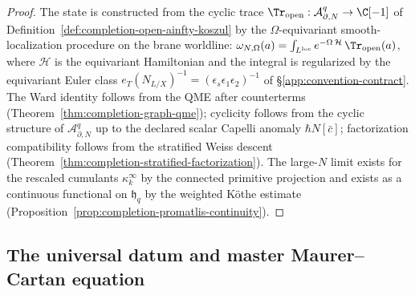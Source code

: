 \begin{proof}
The state is constructed from the cyclic trace
\(\Tr_{\mathrm{open}}:\mathcal A^q_{\partial,N}\to\C[-1]\) of
Definition~\ref{def:completion-open-ainfty-koszul} by the
\(\Omega\)-equivariant smooth-localization procedure on the brane
worldline: \(\omega_{N,\Omega}(a)=
\int_{L^{\mathrm{loc}}}e^{-\Omega\,\mathcal H}\,\Tr_{\mathrm{open}}(a)\),
where \(\mathcal H\) is the equivariant Hamiltonian and the
integral is regularized by the equivariant Euler class
\(e_T(N_{L/X})^{-1}=(\epsilon_s\epsilon_1\epsilon_2)^{-1}\) of
\S\ref{app:convention-contract}.  The Ward identity follows from
the QME after counterterms
(Theorem~\ref{thm:completion-graph-qme}); cyclicity follows from
the cyclic structure of \(\mathcal A^q_{\partial,N}\) up to the
declared scalar Capelli anomaly \(\hbar N[\bar c]\); factorization
compatibility follows from the stratified Weiss descent
(Theorem~\ref{thm:completion-stratified-factorization}).  The
large-\(N\) limit exists for the rescaled cumulants
\(\kappa^\infty_k\) by the connected primitive projection and
exists as a continuous functional on \(\mathfrak h_q\) by the
weighted K\"othe estimate
(Proposition~\ref{prop:completion-promatlis-continuity}).
\end{proof}

\subsection{The universal datum and master Maurer--Cartan equation}
\label{ssec:completion-universal-datum}

